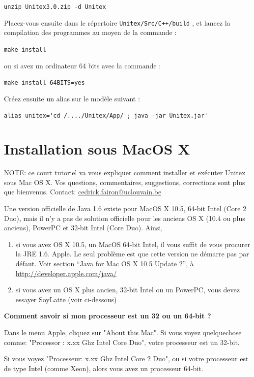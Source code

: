 \bigskip \noindent \verb$unzip Unitex3.0.zip -d Unitex$

\bigskip
\noindent Placez-vous ensuite dans le répertoire \verb|Unitex/Src/C++/build|                                     , et lancez la compilation des
programmes au moyen de la commande :


\bigskip \verb+make install+

\bigskip
\noindent ou si avez un ordinateur 64 bits avec la commande :
 
\bigskip \verb+make install 64BITS=yes+

\bigskip
\noindent Créez ensuite un alias sur le modèle suivant :

\bigskip \verb$alias unitex='cd /..../Unitex/App/ ; java -jar Unitex.jar'$


\section{Installation sous MacOS X}
\label{section-macos-install}
\noindent NOTE: ce court tutoriel va vous expliquer comment installer et exécuter Unitex sous Mac OS
X. Vos questions, commentaires, suggestions,
corrections sont plus que bienvenus.
\noindent Contact: \url{cedrick.fairon@uclouvain.be}

\bigskip
\noindent Une version officielle de Java 1.6 existe pour MacOS X 10.5, 64-bit Intel 
(Core 2 Duo), mais il n'y a pas de solution officielle pour les anciens OS X (10.4 ou plus anciens),
PowerPC et 32-bit Intel (Core Duo). Ainsi,
\begin{enumerate}
\item si vous avez OS X 10.5, un MacOS 64-bit Intel, il vous suffit de vous procurer
	la JRE 1.6. Apple. Le seul problème est que cette version ne démarre pas par défaut.
	Voir section ``Java for Mac OS X 10.5 Update 2'', à \url{http://developer.apple.com/java/}

\item si vous avez un OS X plus ancien, 32-bit Intel ou un PowerPC, vous devez essayer SoyLatte
	(voir ci-dessous)
\end{enumerate}

\noindent\textbf{Comment savoir si mon processeur est un 32 ou un 64-bit ?}

\noindent Dans le menu Apple, cliquez sur "About this Mac". Si vous voyez quelquechose comme:
"Processor : x.xx Ghz Intel Core Duo", votre processeur est un 32-bit.

\bigskip
\noindent Si vous voyez "Processeur: x.xx Ghz Intel Core 2 Duo", ou si votre
processeur est de type Intel (comme Xeon), alors vous avez un processeur 64-bit.

